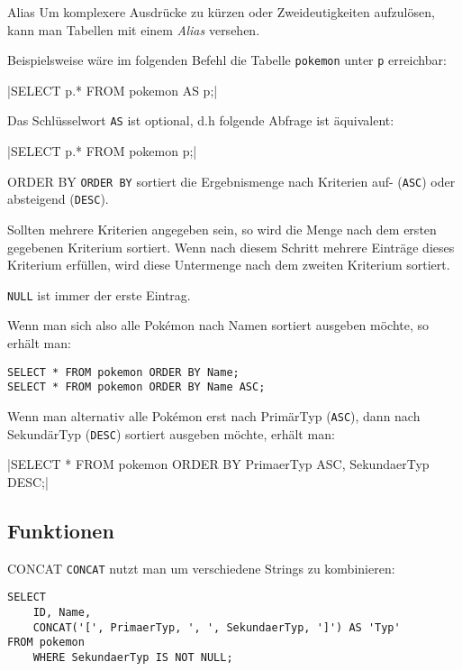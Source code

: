 \begin{bonus}{Alias}
    Um komplexere Ausdrücke zu kürzen oder Zweideutigkeiten aufzulösen, kann man Tabellen mit einem \emph{Alias} versehen.

    Beispielsweise wäre im folgenden Befehl die Tabelle \texttt{pokemon} unter \texttt{p} erreichbar:

    |SELECT p.* FROM pokemon AS p;|

    Das Schlüsselwort \texttt{AS} ist optional, d.h folgende Abfrage ist äquivalent:
    
    |SELECT p.* FROM pokemon p;|
\end{bonus}

\begin{bonus}{ORDER BY}
    \texttt{ORDER BY} sortiert die Ergebnismenge nach Kriterien auf- (\texttt{ASC}) oder absteigend (\texttt{DESC}).
    
    Sollten mehrere Kriterien angegeben sein, so wird die Menge nach dem ersten gegebenen Kriterium sortiert.
    Wenn nach diesem Schritt mehrere Einträge dieses Kriterium erfüllen, wird diese Untermenge nach dem zweiten Kriterium sortiert.

    \texttt{NULL} ist immer der erste Eintrag.
    
    Wenn man sich also alle Pokémon nach Namen sortiert ausgeben möchte, so erhält man:

    \begin{verbatim}
SELECT * FROM pokemon ORDER BY Name;
SELECT * FROM pokemon ORDER BY Name ASC;
    \end{verbatim}

    

    Wenn man alternativ alle Pokémon erst nach PrimärTyp (\texttt{ASC}), dann nach SekundärTyp (\texttt{DESC}) sortiert ausgeben möchte, erhält man:

    |SELECT * FROM pokemon ORDER BY PrimaerTyp ASC, SekundaerTyp DESC;|

    
\end{bonus}

\subsection{Funktionen}

\begin{bonus}{CONCAT}
    \texttt{CONCAT} nutzt man um verschiedene Strings zu kombinieren:

    \begin{verbatim}
SELECT
    ID, Name,
    CONCAT('[', PrimaerTyp, ', ', SekundaerTyp, ']') AS 'Typ'
FROM pokemon
    WHERE SekundaerTyp IS NOT NULL;
    \end{verbatim}

    
\end{bonus}

